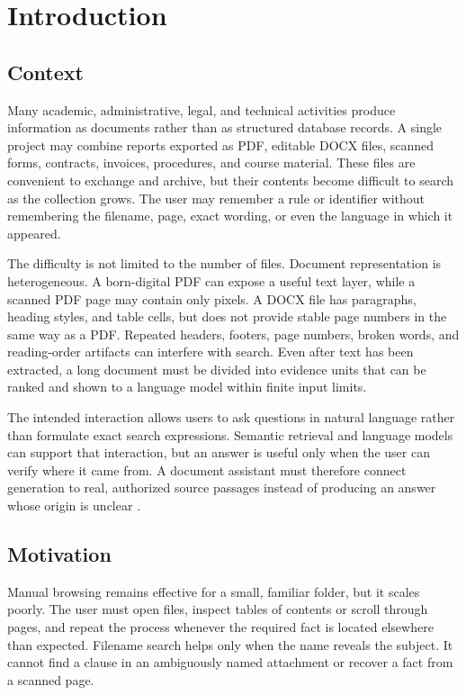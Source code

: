 \chapter{Introduction}
\label{chap:introduction}

\section{Context}
\label{sec:introduction-context}

Many academic, administrative, legal, and technical activities produce information as documents rather than as structured database records. A single project may combine reports exported as PDF, editable DOCX files, scanned forms, contracts, invoices, procedures, and course material. These files are convenient to exchange and archive, but their contents become difficult to search as the collection grows. The user may remember a rule or identifier without remembering the filename, page, exact wording, or even the language in which it appeared.

The difficulty is not limited to the number of files. Document representation is heterogeneous. A born-digital PDF can expose a useful text layer, while a scanned PDF page may contain only pixels. A DOCX file has paragraphs, heading styles, and table cells, but does not provide stable page numbers in the same way as a PDF. Repeated headers, footers, page numbers, broken words, and reading-order artifacts can interfere with search. Even after text has been extracted, a long document must be divided into evidence units that can be ranked and shown to a language model within finite input limits.

The intended interaction allows users to ask questions in natural language rather than formulate exact search expressions. Semantic retrieval and language models can support that interaction, but an answer is useful only when the user can verify where it came from. A document assistant must therefore connect generation to real, authorized source passages instead of producing an answer whose origin is unclear \cite{Lewis2020RAG,Liu2023Verifiability}.

\section{Motivation}
\label{sec:introduction-motivation}

Manual browsing remains effective for a small, familiar folder, but it scales poorly. The user must open files, inspect tables of contents or scroll through pages, and repeat the process whenever the required fact is located elsewhere than expected. Filename search helps only when the name reveals the subject. It cannot find a clause in an ambiguously named attachment or recover a fact from a scanned page.

